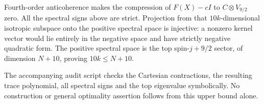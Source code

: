 \documentclass{article}
\begin{document}
Fourth-order anticoherence makes the compression of $F(X)-cI$ to
$C\otimes V_{9/2}$ zero.  All the spectral signs above are strict.
Projection from that $10k$-dimensional isotropic subspace onto the
positive spectral space is injective: a nonzero kernel vector would
lie entirely in the negative space and have strictly negative quadratic
form.  The positive spectral space is the top spin-$j+9/2$ sector,
of dimension $N+10$, proving $10k\le N+10$.

The accompanying audit script checks the Cartesian contractions, the
resulting trace polynomial, all spectral signs and the top eigenvalue
symbolically.  No construction or general optimality assertion follows
from this upper bound alone.
\end{document}

